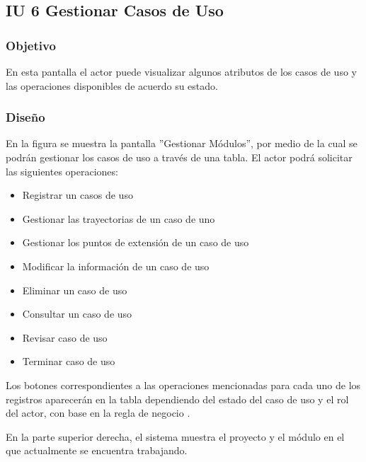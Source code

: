 \subsection{IU 6 Gestionar Casos de Uso}

\subsubsection{Objetivo}
	En esta pantalla el actor puede visualizar algunos atributos de los casos de uso y las operaciones disponibles de acuerdo su estado.
\subsubsection{Diseño}
	En la figura  se muestra la pantalla ''Gestionar Módulos'', por medio de la cual se podrán gestionar los casos de uso a través de una tabla. El actor podrá solicitar las siguientes operaciones:
	\begin{itemize}
		\item Registrar un casos de uso
		\item Gestionar las trayectorias de un caso de uno
		\item Gestionar los puntos de extensión de un caso de uso
		\item Modificar la información de un caso de uso
		\item Eliminar un caso de uso
		\item Consultar un caso de uso
		\item Revisar caso de uso
		\item Terminar caso de uso
	\end{itemize}

Los botones correspondientes a las operaciones mencionadas para cada uno de los registros aparecerán en la tabla dependiendo del estado del caso de uso y el rol del actor, con base en la regla de negocio .

En la parte superior derecha, el sistema muestra el proyecto y el módulo en el que actualmente se encuentra trabajando.
\label{IU6}
